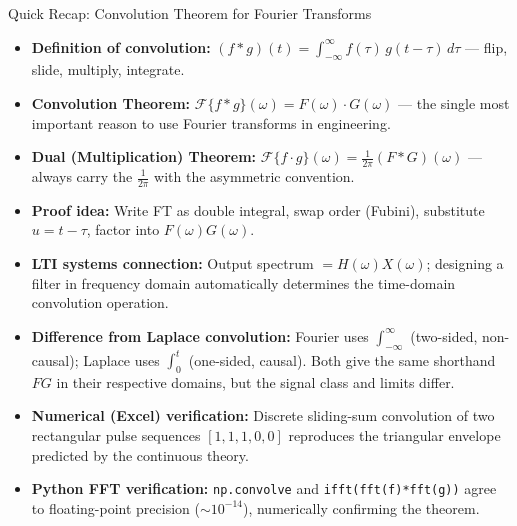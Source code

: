 \documentclass[12pt,a4paper]{article}
\begin{document}
\begin{learnbox}{Quick Recap: Convolution Theorem for Fourier Transforms}
\begin{itemize}
  \item \textbf{Definition of convolution:}
    $(f*g)(t) = \int_{-\infty}^{\infty}f(\tau)\,g(t-\tau)\,d\tau$
    --- flip, slide, multiply, integrate.
  \item \textbf{Convolution Theorem:}
    $\mathcal{F}\{f*g\}(\omega) = F(\omega)\cdot G(\omega)$ --- the single most
    important reason to use Fourier transforms in engineering.
  \item \textbf{Dual (Multiplication) Theorem:}
    $\mathcal{F}\{f\cdot g\}(\omega) = \frac{1}{2\pi}(F*G)(\omega)$
    --- always carry the $\frac{1}{2\pi}$ with the asymmetric convention.
  \item \textbf{Proof idea:} Write FT as double integral, swap order (Fubini),
    substitute $u = t - \tau$, factor into $F(\omega)G(\omega)$.
  \item \textbf{LTI systems connection:} Output spectrum $= H(\omega)X(\omega)$;
    designing a filter in frequency domain automatically determines the
    time-domain convolution operation.
  \item \textbf{Difference from Laplace convolution:} Fourier uses
    $\int_{-\infty}^{\infty}$ (two-sided, non-causal); Laplace uses $\int_0^t$
    (one-sided, causal). Both give the same shorthand $FG$ in their respective
    domains, but the signal class and limits differ.
  \item \textbf{Numerical (Excel) verification:} Discrete sliding-sum convolution
    of two rectangular pulse sequences $[1,1,1,0,0]$ reproduces the triangular
    envelope predicted by the continuous theory.
  \item \textbf{Python FFT verification:} \texttt{np.convolve} and
    \texttt{ifft(fft(f)*fft(g))} agree to floating-point precision
    ($\sim 10^{-14}$), numerically confirming the theorem.
\end{itemize}
\end{learnbox}
\end{document}
